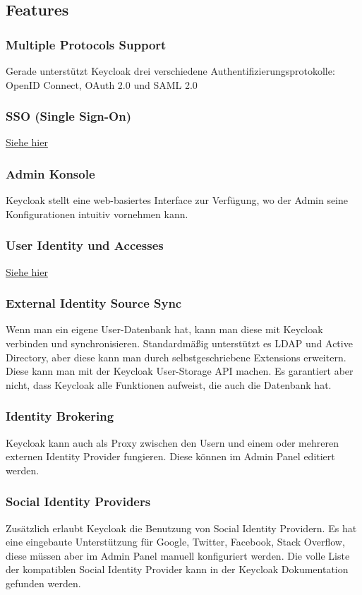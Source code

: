 \subsection{Features}
\subsubsection{Multiple Protocols Support}
Gerade unterstützt Keycloak drei verschiedene Authentifizierungsprotokolle: OpenID Connect, OAuth 2.0 und SAML 2.0 \cite{KeyCloakDZone}
\subsubsection{SSO (Single Sign-On)}
\hyperref[sec:SSO]{Siehe hier}
\subsubsection{Admin Konsole}
Keycloak stellt eine web-basiertes Interface zur Verfügung, wo der Admin seine Konfigurationen intuitiv vornehmen kann. \cite{KeyCloakDZone}
\subsubsection{User Identity und Accesses}
\hyperref[sec:IAM]{Siehe hier}
\subsubsection{External Identity Source Sync}
Wenn man ein eigene User-Datenbank  hat, kann man diese mit Keycloak verbinden und synchronisieren. Standardmäßig unterstützt es LDAP und Active Directory, aber diese
kann man durch selbstgeschriebene Extensions erweitern. Diese kann man mit der Keycloak User-Storage API machen. Es garantiert aber nicht, dass Keycloak alle Funktionen aufweist,
die auch die Datenbank hat. \cite{KeyCloakDZone}
\subsubsection{Identity Brokering}
Keycloak kann auch als Proxy zwischen den Usern und einem oder mehreren externen Identity Provider fungieren. Diese können im Admin Panel editiert werden. \cite{KeyCloakDZone}
\subsubsection{Social Identity Providers}
Zusätzlich erlaubt Keycloak die Benutzung von Social Identity Providern. Es hat eine eingebaute Unterstützung für Google, Twitter, Facebook, Stack Overflow, diese müssen aber 
im Admin Panel manuell konfiguriert werden. Die volle Liste der kompatiblen Social Identity Provider kann in der Keycloak Dokumentation gefunden werden. \cite{KeyCloakDZone}
